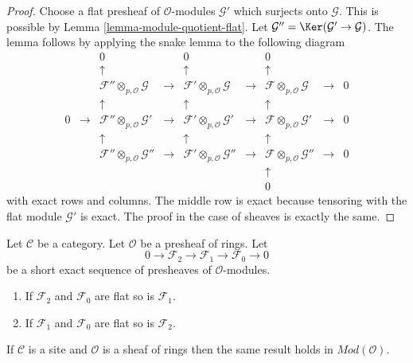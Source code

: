 \begin{proof}
Choose a flat presheaf of $\mathcal{O}$-modules $\mathcal{G}'$
which surjects onto $\mathcal{G}$. This is possible by
Lemma \ref{lemma-module-quotient-flat}. Let
$\mathcal{G}'' = \Ker(\mathcal{G}' \to \mathcal{G})$.
The lemma follows by applying the snake lemma to the following
diagram
$$
\begin{matrix}
 & & 0 & & 0 & & 0 & & \\
 & & \uparrow & & \uparrow & & \uparrow & & \\
 & & \mathcal{F}'' \otimes_{p, \mathcal{O}} \mathcal{G} & \to &
     \mathcal{F}' \otimes_{p, \mathcal{O}} \mathcal{G} & \to &
     \mathcal{F} \otimes_{p, \mathcal{O}} \mathcal{G} & \to & 0 \\
 & & \uparrow & & \uparrow & & \uparrow & & \\
0 & \to & \mathcal{F}'' \otimes_{p, \mathcal{O}} \mathcal{G}' & \to &
          \mathcal{F}' \otimes_{p, \mathcal{O}} \mathcal{G}' & \to &
          \mathcal{F} \otimes_{p, \mathcal{O}} \mathcal{G}' & \to & 0 \\
 & & \uparrow & & \uparrow & & \uparrow & & \\
 & & \mathcal{F}'' \otimes_{p, \mathcal{O}} \mathcal{G}'' & \to &
     \mathcal{F}' \otimes_{p, \mathcal{O}} \mathcal{G}'' & \to &
     \mathcal{F} \otimes_{p, \mathcal{O}} \mathcal{G}'' & \to & 0 \\
 & & & & & & \uparrow & & \\
 & & & & & & 0 & &
\end{matrix}
$$
with exact rows and columns. The middle row is exact because tensoring
with the flat module $\mathcal{G}'$ is exact. The proof in the case
of sheaves is exactly the same.
\end{proof}

\begin{lemma}
\label{lemma-flat-ses}
Let $\mathcal{C}$ be a category.
Let $\mathcal{O}$ be a presheaf of rings.
Let
$$
0 \to
\mathcal{F}_2 \to
\mathcal{F}_1 \to
\mathcal{F}_0 \to 0
$$
be a short exact sequence of presheaves of $\mathcal{O}$-modules.
\begin{enumerate}
\item If $\mathcal{F}_2$ and $\mathcal{F}_0$ are flat so is
$\mathcal{F}_1$.
\item If $\mathcal{F}_1$ and $\mathcal{F}_0$ are flat so is
$\mathcal{F}_2$.
\end{enumerate}
If $\mathcal{C}$ is a site and $\mathcal{O}$ is a
sheaf of rings then the same result holds in $\textit{Mod}(\mathcal{O})$.
\end{lemma}

